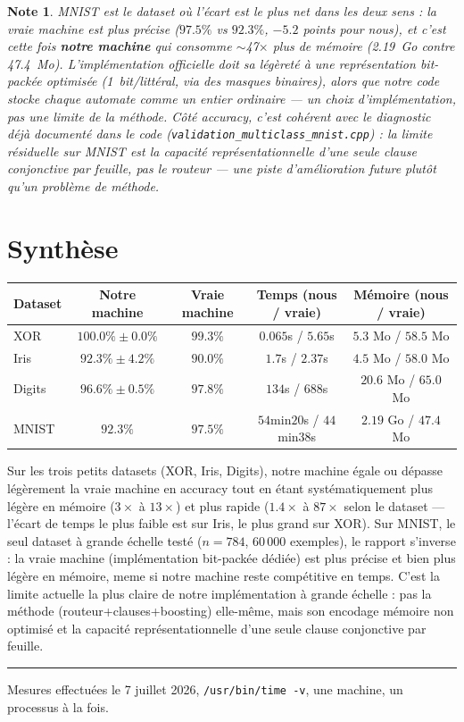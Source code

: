\documentclass[12pt,a4paper]{article}
\newcommand{\code}[1]{\texttt{#1}}
\theoremstyle{plain}
\newtheorem{note}{Note}[section]
\begin{document}
\begin{note}
MNIST est le dataset o\`u l'\'ecart est le plus net dans les deux sens : la vraie machine est plus pr\'ecise ($97.5\%$ vs $92.3\%$, $-5.2$ points pour nous), et c'est cette fois \textbf{notre machine} qui consomme $\sim$47$\times$ plus de m\'emoire (2.19~Go contre 47.4~Mo). L'impl\'ementation officielle doit sa l\'eg\`eret\'e \`a une repr\'esentation bit-pack\'ee optimis\'ee (1~bit/litt\'eral, via des masques binaires), alors que notre code stocke chaque automate comme un entier ordinaire --- un choix d'impl\'ementation, pas une limite de la m\'ethode. C\^ot\'e accuracy, c'est coh\'erent avec le diagnostic d\'ej\`a document\'e dans le code (\code{validation\_multiclass\_mnist.cpp}) : la limite r\'esiduelle sur MNIST est la capacit\'e repr\'esentationnelle d'une seule clause conjonctive par feuille, pas le routeur --- une piste d'am\'elioration future plut\^ot qu'un probl\`eme de m\'ethode.
\end{note}

\section{Synth\`ese}

\begin{center}
\renewcommand{\arraystretch}{1.35}
\begin{tabular}{lcccc}
\toprule
Dataset & Notre machine & Vraie machine & Temps (nous / vraie) & M\'emoire (nous / vraie) \\
\midrule
XOR     & $100.0\% \pm 0.0\%$ & $99.3\%$ & $0.065$s / $5.65$s     & $5.3$ Mo / $58.5$ Mo \\
Iris    & $92.3\% \pm 4.2\%$  & $90.0\%$ & $1.7$s / $2.37$s       & $4.5$ Mo / $58.0$ Mo \\
Digits  & $96.6\% \pm 0.5\%$  & $97.8\%$ & $134$s / $688$s        & $20.6$ Mo / $65.0$ Mo \\
MNIST   & $92.3\%$            & $97.5\%$ & $54$min$20$s / $44$min$38$s & $2.19$ Go / $47.4$ Mo \\
\bottomrule
\end{tabular}
\end{center}

\noindent Sur les trois petits datasets (XOR, Iris, Digits), notre machine \'egale ou d\'epasse l\'eg\`erement la vraie machine en accuracy tout en \'etant syst\'ematiquement plus l\'eg\`ere en m\'emoire ($3\times$ \`a $13\times$) et plus rapide ($1.4\times$ \`a $87\times$ selon le dataset --- l'\'ecart de temps le plus faible est sur Iris, le plus grand sur XOR). Sur MNIST, le seul dataset \`a grande \'echelle test\'e ($n{=}784$, $60\,000$ exemples), le rapport s'inverse : la vraie machine (impl\'ementation bit-pack\'ee d\'edi\'ee) est plus pr\'ecise et bien plus l\'eg\`ere en m\'emoire, meme si notre machine reste comp\'etitive en temps. C'est la limite actuelle la plus claire de notre impl\'ementation \`a grande \'echelle : pas la m\'ethode (routeur+clauses+boosting) elle-m\^eme, mais son encodage m\'emoire non optimis\'e et la capacit\'e repr\'esentationnelle d'une seule clause conjonctive par feuille.

\vfill
\hrule
\vspace{0.4em}
\noindent\footnotesize
Mesures effectu\'ees le 7 juillet 2026, \code{/usr/bin/time -v}, une machine, un processus \`a la fois.
\end{document}

